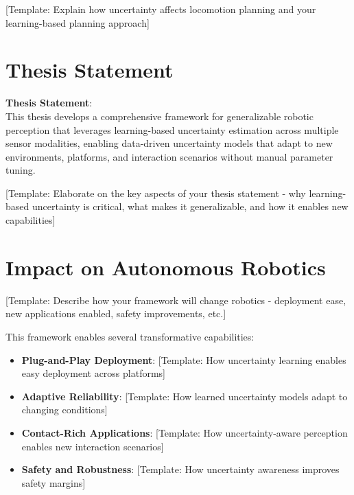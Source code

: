 [Template: Explain how uncertainty affects locomotion planning and your learning-based planning approach]

\section{Thesis Statement}
\label{sec:thesis_statement}

\begin{framed}
\centering
\textbf{Thesis Statement}: \\ 
This thesis develops a comprehensive framework for generalizable robotic perception that leverages learning-based uncertainty estimation across multiple sensor modalities, enabling data-driven uncertainty models that adapt to new environments, platforms, and interaction scenarios without manual parameter tuning.
\end{framed}

[Template: Elaborate on the key aspects of your thesis statement - why learning-based uncertainty is critical, what makes it generalizable, and how it enables new capabilities]

\section{Impact on Autonomous Robotics}
\label{sec:impact}

[Template: Describe how your framework will change robotics - deployment ease, new applications enabled, safety improvements, etc.]

This framework enables several transformative capabilities:

\begin{itemize}
    \item \textbf{Plug-and-Play Deployment}: [Template: How uncertainty learning enables easy deployment across platforms]
    \item \textbf{Adaptive Reliability}: [Template: How learned uncertainty models adapt to changing conditions]
    \item \textbf{Contact-Rich Applications}: [Template: How uncertainty-aware perception enables new interaction scenarios]
    \item \textbf{Safety and Robustness}: [Template: How uncertainty awareness improves safety margins]
\end{itemize}

